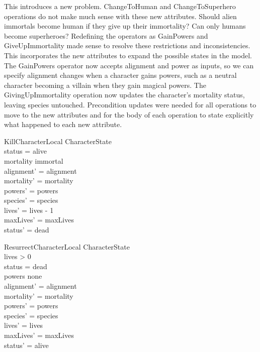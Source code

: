 \documentclass{article}
\begin{document}
\hspace{-0.68cm} This introduces a new problem. ChangeToHuman and ChangeToSuperhero operations do not make much sense with these new attributes. Should alien immortals become human if they give up their immortality? Can only humans become superheroes? Redefining the operators as GainPowers and GiveUpImmortality made sense to resolve these restrictions and inconsistencies. This incorporates the new attributes to expand the possible states in the model. \\
\newline
The GainPowers operator now accepts alignment and power as inputs, so we can specify alignment changes when a character gains powers, such as a neutral character becoming a villain when they gain magical powers. The GivingUpImmortality operation now updates the character’s mortality status, leaving species untouched. Precondition updates were needed for all operations to move to the new attributes and for the body of each operation to state explicitly what happened to each new attribute.
\begin{schema}{KillCharacterLocal} 
\Delta CharacterState \\
\where
status = alive \\
mortality \neq immortal \\
alignment' = alignment \\
mortality' = mortality \\
powers' = powers \\ 
species' = species \\
lives' = lives - 1 \\
maxLives' = maxLives \\
status' = dead \\
\end{schema}

\begin{schema}{ResurrectCharacterLocal}
\Delta CharacterState \\
\where
lives > 0 \\
status = dead \\
powers \neq none \\ 
alignment' = alignment \\
mortality' = mortality \\
powers' = powers \\ 
species' = species \\
lives' = lives \\
maxLives' = maxLives \\
status' = alive \\
\end{schema}
\end{document}
